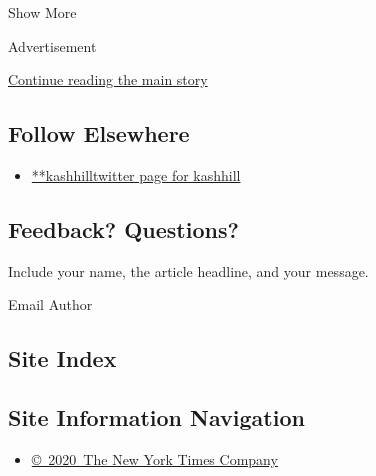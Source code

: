 Show More

Advertisement

\protect\hyperlink{after-mid2}{Continue reading the main story}

\hypertarget{follow-elsewhere}{%
\subsection{Follow Elsewhere}\label{follow-elsewhere}}

\begin{itemize}
\tightlist
\item
  \href{https://twitter.com/kashhill}{**kashhilltwitter page for
  kashhill}
\end{itemize}

\hypertarget{feedback-questions}{%
\subsection{Feedback? Questions?}\label{feedback-questions}}

Include your name, the article headline, and your message.

Email Author

\hypertarget{site-index}{%
\subsection{Site Index}\label{site-index}}

\hypertarget{site-information-navigation}{%
\subsection{Site Information
Navigation}\label{site-information-navigation}}

\begin{itemize}
\tightlist
\item
  \href{https://help.nytimes.com/hc/en-us/articles/115014792127-Copyright-notice}{©~2020~The
  New York Times Company}
\end{itemize}


